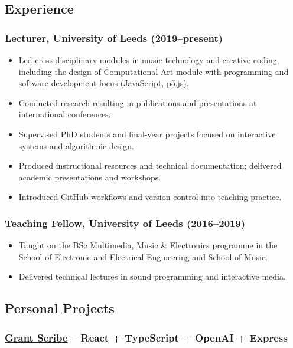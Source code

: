 \documentclass[11pt,a4paper]{article}
\providecommand{\tightlist}{%
  \setlength{\itemsep}{0pt}\setlength{\parskip}{0pt}}
\begin{document}
\subsection{Experience}\label{experience}

\subsubsection{Lecturer, University of Leeds
(2019--present)}\label{lecturer-university-of-leeds-2019present}

\begin{itemize}
\tightlist
\item
  Led cross-disciplinary modules in music technology and creative
  coding, including the design of Computational Art module with
  programming and software development focus (JavaScript, p5.js).
\item
  Conducted research resulting in publications and presentations at
  international conferences.
\item
  Supervised PhD students and final-year projects focused on interactive
  systems and algorithmic design.
\item
  Produced instructional resources and technical documentation;
  delivered academic presentations and workshops.
\item
  Introduced GitHub workflows and version control into teaching
  practice.
\end{itemize}

\subsubsection{Teaching Fellow, University of Leeds
(2016--2019)}\label{teaching-fellow-university-of-leeds-20162019}

\begin{itemize}
\tightlist
\item
  Taught on the BSc Multimedia, Music \& Electronics programme in the
  School of Electronic and Electrical Engineering and School of Music.
\item
  Delivered technical lectures in sound programming and interactive
  media.
\end{itemize}

\subsection{Personal Projects}\label{personal-projects}

\subsubsection{\texorpdfstring{\href{https://github.com/thrly}{Grant
Scribe} -- React + TypeScript + OpenAI +
Express}{Grant Scribe -- React + TypeScript + OpenAI + Express}}\label{grant-scribe-react-typescript-openai-express}
\end{document}
